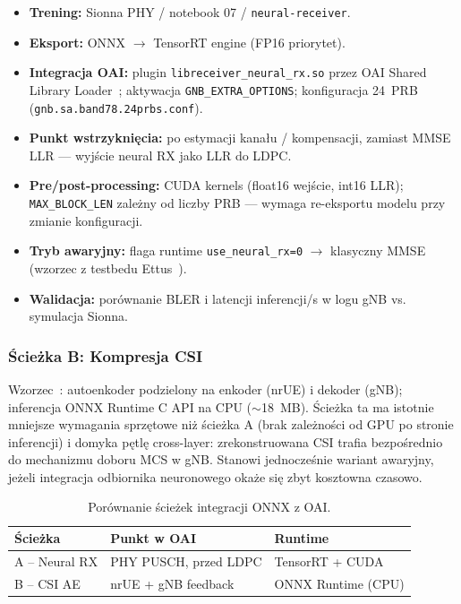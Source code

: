 \documentclass[12pt, a4paper]{article}
\begin{document}
\begin{itemize}[leftmargin=*]
    \item \textbf{Trening:} Sionna PHY / notebook 07 / \texttt{neural-receiver}.
    \item \textbf{Eksport:} ONNX $\rightarrow$ TensorRT engine (FP16 priorytet).
    \item \textbf{Integracja OAI:} plugin \texttt{libreceiver\_neural\_rx.so} przez OAI Shared Library Loader~\cite{sionna-rk,neural-rx-repo}; aktywacja \texttt{GNB\_EXTRA\_OPTIONS}; konfiguracja 24~PRB (\texttt{gnb.sa.band78.24prbs.conf}).
    \item \textbf{Punkt wstrzyknięcia:} po estymacji kanału / kompensacji, zamiast MMSE LLR --- wyjście neural RX jako LLR do LDPC.
    \item \textbf{Pre/post-processing:} CUDA kernels (float16 wejście, int16 LLR); \texttt{MAX\_BLOCK\_LEN} zależny od liczby PRB --- wymaga re-eksportu modelu przy zmianie konfiguracji.
    \item \textbf{Tryb awaryjny:} flaga runtime \texttt{use\_neural\_rx=0} $\rightarrow$ klasyczny MMSE (wzorzec z testbedu Ettus~\cite{ettus-nrx-testbed}).
    \item \textbf{Walidacja:} porównanie BLER i latencji inferencji/s w logu gNB vs. symulacja Sionna.
\end{itemize}

\subsubsection{Ścieżka B: Kompresja CSI}

Wzorzec~\cite{cheng-oai-csi-2024}: autoenkoder podzielony na enkoder (nrUE) i dekoder (gNB); inferencja ONNX Runtime C API na CPU ($\sim$18~MB). Ścieżka ta ma istotnie mniejsze wymagania sprzętowe niż ścieżka A (brak zależności od GPU po stronie inferencji) i domyka pętlę cross-layer: zrekonstruowana CSI trafia bezpośrednio do mechanizmu doboru MCS w gNB. Stanowi jednocześnie wariant awaryjny, jeżeli integracja odbiornika neuronowego okaże się zbyt kosztowna czasowo.

\begin{table}[htbp]
\centering
\small
\begin{tabularx}{\textwidth}{@{}l X X@{}}
\toprule
\textbf{Ścieżka} & \textbf{Punkt w OAI} & \textbf{Runtime} \\
\midrule
A -- Neural RX & PHY PUSCH, przed LDPC & TensorRT + CUDA \\
B -- CSI AE & nrUE + gNB feedback & ONNX Runtime (CPU) \\
\bottomrule
\end{tabularx}
\caption{Porównanie ścieżek integracji ONNX z OAI.}
\end{table}
\end{document}
